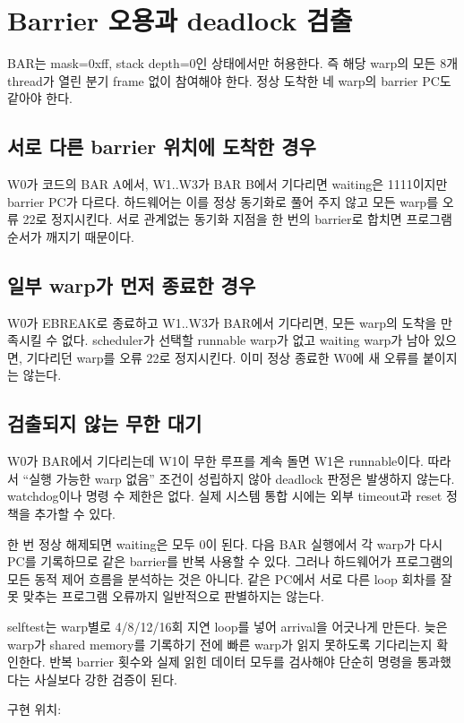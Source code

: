 \documentclass[a4paper,11pt]{article}
\newcommand{\chapterpage}[1]{\clearpage\section{#1}}
\newcommand{\source}[1]{\par{\small\color{teal}구현 위치: \urlstyle{same}\path{#1}}\par}
\begin{document}
\chapterpage{Barrier 오용과 deadlock 검출}
BAR는 mask=0xff, stack depth=0인 상태에서만 허용한다. 즉 해당 warp의 모든 8개 thread가 열린 분기 frame 없이 참여해야 한다. 정상 도착한 네 warp의 barrier PC도 같아야 한다.
\subsection{서로 다른 barrier 위치에 도착한 경우}
W0가 코드의 BAR A에서, W1..W3가 BAR B에서 기다리면 waiting은 1111이지만 barrier PC가 다르다. 하드웨어는 이를 정상 동기화로 풀어 주지 않고 모든 warp를 오류 22로 정지시킨다. 서로 관계없는 동기화 지점을 한 번의 barrier로 합치면 프로그램 순서가 깨지기 때문이다.
\subsection{일부 warp가 먼저 종료한 경우}
W0가 EBREAK로 종료하고 W1..W3가 BAR에서 기다리면, 모든 warp의 도착을 만족시킬 수 없다. scheduler가 선택할 runnable warp가 없고 waiting warp가 남아 있으면, 기다리던 warp를 오류 22로 정지시킨다. 이미 정상 종료한 W0에 새 오류를 붙이지는 않는다.
\subsection{검출되지 않는 무한 대기}
W0가 BAR에서 기다리는데 W1이 무한 루프를 계속 돌면 W1은 runnable이다. 따라서 ``실행 가능한 warp 없음'' 조건이 성립하지 않아 deadlock 판정은 발생하지 않는다. watchdog이나 명령 수 제한은 없다. 실제 시스템 통합 시에는 외부 timeout과 reset 정책을 추가할 수 있다.
\begin{keybox}[반복 barrier의 사용]
한 번 정상 해제되면 waiting은 모두 0이 된다. 다음 BAR 실행에서 각 warp가 다시 PC를 기록하므로 같은 barrier를 반복 사용할 수 있다. 그러나 하드웨어가 프로그램의 모든 동적 제어 흐름을 분석하는 것은 아니다. 같은 PC에서 서로 다른 loop 회차를 잘못 맞추는 프로그램 오류까지 일반적으로 판별하지는 않는다.
\end{keybox}
selftest는 warp별로 4/8/12/16회 지연 loop를 넣어 arrival을 어긋나게 만든다. 늦은 warp가 shared memory를 기록하기 전에 빠른 warp가 읽지 못하도록 기다리는지 확인한다. 반복 barrier 횟수와 실제 읽힌 데이터 모두를 검사해야 단순히 명령을 통과했다는 사실보다 강한 검증이 된다.
\source{rtl/simt_sm.sv}
\end{document}
